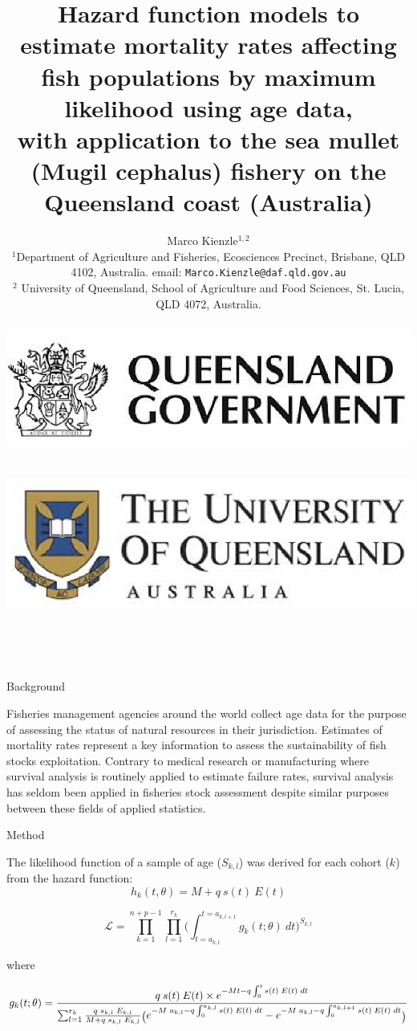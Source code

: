 \documentclass[final]{beamer}
\title{Hazard function models to estimate mortality rates affecting fish populations by maximum likelihood using age data,\\ with application to the sea mullet (Mugil cephalus) fishery on the Queensland coast (Australia)}
\author{Marco Kienzle$^{1,2}$ \\{\small $^{1}$Department of Agriculture and Fisheries, Ecosciences Precinct, Brisbane, QLD 4102, Australia. email: \texttt{Marco.Kienzle@daf.qld.gov.au}\\ $^{2}$ University of Queensland, School of Agriculture and Food Sciences, St. Lucia, QLD 4072, Australia.}
  \vfill
  \includegraphics[width=15cm, height=5cm]{QG-logo.ps} \hspace{52cm} \includegraphics[width=15cm,height=5cm]{UQ-logo.ps}}
\date{}
\begin{document}
\begin{frame}{} 
  \begin{columns}[t]


    \begin{column}{.47\linewidth}

      
      \begin{block}{Background}

        Fisheries management agencies around the world collect age data for the purpose of assessing the status of natural resources in their jurisdiction. Estimates of mortality rates represent a key information to assess the sustainability of fish stocks exploitation. Contrary to medical research or manufacturing where survival analysis is routinely applied to estimate failure rates, survival analysis has seldom been applied in fisheries stock assessment despite similar purposes between these fields of applied statistics.
        
      \end{block}

      
      \begin{block}{Method}

        The likelihood function of a sample of age ($S_{k,l}$) was derived for each cohort ($k$) from the hazard function:
        \begin{equation}
          h_{k}(t, \theta) = M + q \ s(t) \ E(t)
          \end{equation}

\begin{equation}
\mathcal{L} = \prod_{k=1}^{n+p-1} \prod_{l=1}^{r_{k}}  \bigl ( \int_{t=a_{k,l}}^{t=a_{k,l+1}} g_{k}(t; \theta) \ dt \bigr ) ^ {S_{k,l}}
\end{equation}

\noindent where

\begin{equation}
\tiny
g_{k}(t; \theta) = \frac{q \ s(t) \ E(t) \times e^{-Mt-q\int_{0}^{t} s(t) \ E(t) \ dt}}{\sum_{l=1}^{r_{k}} \frac{q \ s_{k,l} \ E_{k,l}}{M+q \ s_{k,l} \ E_{k,l}} \bigl ( e^{-M \ a_{k,l}-q\int_{0}^{a_{k,l}}s(t) \ E(t) \ dt} - e^{-M \ a_{k,l}-q\int_{0}^{a_{k,l+1}}s(t) \ E(t) \ dt} \bigr )} 
\end{equation}


\end{block}
\end{column}
\end{columns}
\end{frame}
\end{document}
